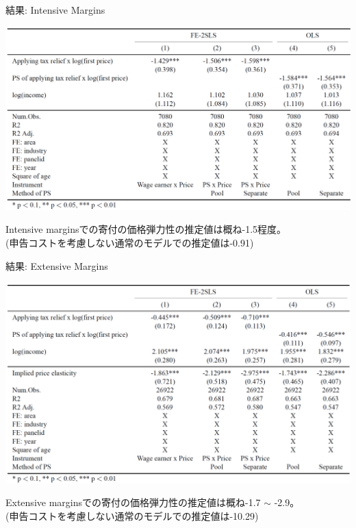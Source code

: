 \documentclass[dvipdfmx,10pt]{beamer}
\begin{document}
\begin{frame}{結果: Intensive Margins}
	\begin{table}
		\centering
		\includegraphics[width=0.9\linewidth]{Tab_res_1}
		\caption{First-Price Elasticities (Intensive Margins)}
		\label{tab:2}
	\end{table}
Intensive marginsでの寄付の価格弾力性の推定値は概ね-1.5程度。\\
(申告コストを考慮しない通常のモデルでの推定値は-0.91)
\end{frame}

\begin{frame}{結果: Extensive Margins}
	\begin{table}
		\centering
		\includegraphics[width=0.9\linewidth]{Tab_res_2}
		\caption{First-Price Elasticities (Extensive Margins)}
		\label{tab:3}
	\end{table}
	Extensive marginsでの寄付の価格弾力性の推定値は概ね-1.7 $\sim$ -2.9。\\
	(申告コストを考慮しない通常のモデルでの推定値は-10.29)
\end{frame}
\end{document}
